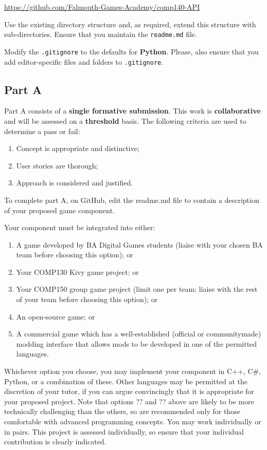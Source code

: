 \documentclass{../fal_assignment}
\begin{document}
\indent \url{https://github.com/Falmouth-Games-Academy/comp140-API }

Use the existing directory structure and, as required, extend this structure with sub-directories. Ensure that you maintain the \texttt{readme.md} file.

Modify the \texttt{.gitignore} to the defaults for \textbf{Python}. Please, also ensure that you add editor-specific files and folders to \texttt{.gitignore}. 

\subsection*{Part A}

Part A consists of a \textbf{single formative submission}. This work is \textbf{collaborative} and will be assessed on a \textbf{threshold} basis. The following criteria are used to determine a pass or fail:

\begin{enumerate}[label=(\alph*)]
	\item Concept is appropriate and distinctive;
	\item User stories are thorough;
	\item Approach is considered and justified.
\end{enumerate}

To complete part A, on GitHub, edit the readme.md file to contain a description of your proposed game component. 

Your component must be integrated into either:

\begin{enumerate}[label=(\alph*)]
	\item A game developed by BA Digital Games students (liaise with your chosen BA team before choosing this option); or 
	\item Your COMP130 Kivy game project; or 
	\item Your COMP150 group game project (limit one per team: liaise with the rest of your team before choosing this option); or 
	\item An open-source game; or
	\item A commercial game which has a well-established (official or communitymade) modding interface that allows mods to be developed in one of the permitted languages. 
\end{enumerate}

Whichever option you choose, you may implement your component in C++, C#, Python, or a combination of these. Other languages may be permitted at the discretion of your tutor, if you can argue convincingly that it is appropriate for your proposed project. Note that options ?? and ?? above are likely to be more technically challenging than the others, so are recommended only for those comfortable with advanced programming concepts. You may work individually or in pairs. This project is assessed individually, so ensure that your individual contribution is clearly indicated.
\end{document}
